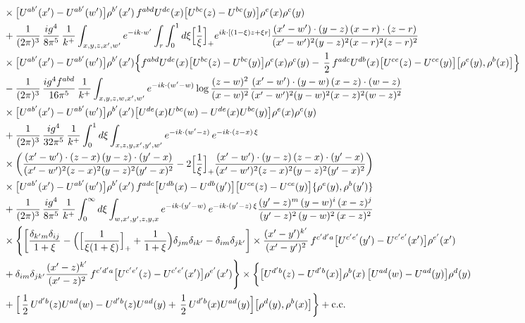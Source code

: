 \documentclass[9pt]{article}
\numberwithin{equation}{section}
\begin{document}
\begin{align}
&\times\big[U^{ab'}(x')-U^{ab'}(w')\big]\rho^{b'}(x')\,f^{abd}U^{de}(x)\big[U^{bc}(z)-U^{bc}(y)\big]\rho^{e}(x)\rho^{c}(y)\notag\\
&+\frac{1}{(2\pi)^{3}}\,\frac{ig^{4}}{8\pi^{5}}\,\frac{1}{k^{+}}\int_{x,y,z,x',w'}e^{-ik\cdot w'}\int_{r}\int_{0}^{1}d\xi\Big[\frac1\xi\Big]_{+}e^{ik\cdot[(1-\xi)z+\xi r]}\frac{(x'-w')\cdot(y-z)\,(x-r)\cdot(z-r)}{(x'-w')^{2}(y-z)^{2}(x-r)^{2}(z-r)^{2}}\notag\\
&\times\big[U^{ab'}(x')-U^{ab'}(w')\big]\rho^{b'}(x')\Big\{f^{abd}U^{de}(x)\big[U^{bc}(z)-U^{bc}(y)\big]\rho^{e}(x)\rho^{c}(y)-\,\frac{1}{2}\,f^{adc}U^{db}(x)\big[U^{ce}(z)-U^{ce}(y)\big]\big[\rho^{e}(y),\rho^{b}(x)\big]\Big\}\notag\\
&-\frac{1}{(2\pi)^{3}}\,\frac{ig^{4}f^{abd}}{16\pi^{5}}\,\frac{1}{k^{+}}\int_{x,y,z,w,x',w'}e^{-ik\cdot(w'-w)}\log\frac{(z-w)^{2}}{(x-w)^{2}}\frac{(x'-w')\cdot(y-w)\,(x-z)\cdot(w-z)}{(x'-w')^{2}(y-w)^{2}(x-z)^{2}(w-z)^{2}}\notag\\
&\times\big[U^{ab'}(x')-U^{ab'}(w')\big]\rho^{b'}(x')\big[U^{de}(x)U^{bc}(w)-U^{de}(x)U^{bc}(y)\big]\rho^{e}(x)\rho^{c}(y)\notag\\
&+\frac{1}{(2\pi)^{3}}\,\frac{ig^{4}}{32\pi^{5}}\,\frac{1}{k^{+}}\int_{0}^{1}d\xi\int_{x,z,y,x',y',w'}e^{-ik\cdot(w'-z)}\,e^{-ik\cdot(z-x)\,\xi}\notag\\
&\times\bigg(\frac{(x'-w')\cdot(z-x)\,(y-z)\cdot(y'-x)}{(x'-w')^{2}(z-x)^{2}(y-z)^{2}(y'-x)^{2}}-2\Big[\frac{1}{\xi}\Big]_{+}\frac{(x'-w')\cdot(y-z)\,(z-x)\cdot(y'-x)}{(x'-w')^{2}(z-x)^{2}(y-z)^{2}(y'-x)^{2}}\bigg)\notag\\
&\times\big[U^{ab'}(x')-U^{ab'}(w')\big]\rho^{b'}(x')\,f^{adc}\big[U^{db}(x)-U^{db}(y')\big]\big[U^{ce}(z)-U^{ce}(y)\big]\{\rho^{e}(y),\rho^{b}(y')\}\notag\\
&+\frac{1}{(2\pi)^{3}}\,\frac{ig^{4}}{8\pi^{5}}\,\frac{1}{k^{+}}\int_{0}^{\infty}d\xi\int_{w,x',y',z,y,x}e^{-ik\cdot(y'-w)}\,e^{-ik\cdot(y'-z)\,\xi}\frac{(y'-z)^{m}\,(y-w)^{i}\,(x-z)^{j}}{(y'-z)^{2}\,(y-w)^{2}\,(x-z)^{2}}\notag\\
&\times\Bigg\{\bigg[\frac{\delta_{k'm}\delta_{ij}}{1+\xi}-\Big(\Big[\frac{1}{\xi(1+\xi)}\Big]_{+}+\frac{1}{1+\xi}\Big)\delta_{jm}\delta_{ik'}-\delta_{im}\delta_{jk'}\bigg]\times\frac{(x'-y')^{k'}}{(x'-y')^{2}}\,f^{c'd'a}\big[U^{c'e'}(y')-U^{c'e'}(x')\big]\rho^{e'}(x')\notag\\
&+\delta_{im}\delta_{jk'}\frac{(x'-z)^{k'}}{(x'-z)^{2}}\,f^{c'd'a}\big[U^{c'e'}(z)-U^{c'e'}(x')\big]\rho^{e'}(x')\Bigg\}\times\bigg\{\big[U^{d'b}(z)-U^{d'b}(x)\big]\rho^{b}(x)\,\big[U^{ad}(w)-U^{ad}(y)\big]\rho^{d}(y)\notag\\
&+\Big[\,\frac{1}{2}\,U^{d'b}(z)U^{ad}(w)-U^{d'b}(z)U^{ad}(y)+\,\frac{1}{2}\,U^{d'b}(x)U^{ad}(y)\Big]\big[\rho^{d}(y),\rho^{b}(x)\big]\bigg\}+{\rm c.c.}
\end{align}
\end{document}
